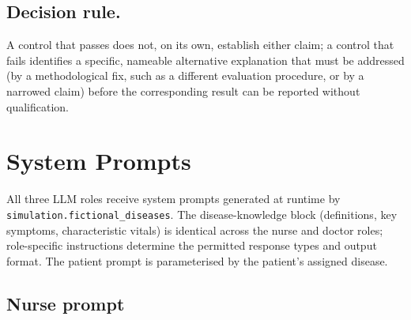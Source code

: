 \documentclass[utf8]{frontiers_suppmat} %
\begin{document}
\subsection{Decision rule.} A control that passes does not, on its own,
establish either claim; a control that fails identifies a specific,
nameable alternative explanation that must be addressed (by a methodological
fix, such as a different evaluation procedure, or by a narrowed claim) before
the corresponding result can be reported without qualification.


\section{System Prompts}
\label{sec:supp-system-prompts}

All three LLM roles receive system prompts generated at runtime by
\texttt{simulation.fictional\_diseases}. The disease-knowledge block
(definitions, key symptoms, characteristic vitals) is identical across
the nurse and doctor roles; role-specific instructions determine the
permitted response types and output format. The patient prompt is
parameterised by the patient's assigned disease.

\subsection{Nurse prompt}
\end{document}
